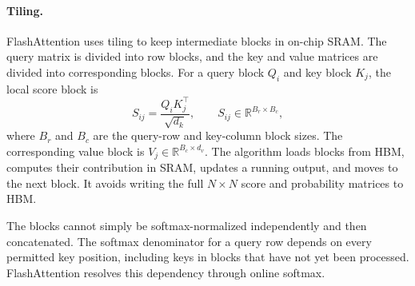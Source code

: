 \paragraph{Tiling.}
FlashAttention uses tiling to keep intermediate blocks in on-chip SRAM.
The query matrix is divided into row blocks, and the key and value
matrices are divided into corresponding blocks. For a query block
\(Q_i\) and key block \(K_j\), the local score block is
\begin{equation}
    S_{ij}
    =
    \frac{Q_iK_j^\top}{\sqrt{d_k}},
    \qquad
    S_{ij}\in\mathbb{R}^{B_r\times B_c},
    \label{eq:attn-flash-score-tile}
\end{equation}
where \(B_r\) and \(B_c\) are the query-row and key-column block sizes.
The corresponding value block is
\(V_j\in\mathbb{R}^{B_c\times d_v}\). The algorithm loads blocks from
HBM, computes their contribution in SRAM, updates a running output, and
moves to the next block. It avoids writing the full \(N\times N\) score
and probability matrices to HBM.

The blocks cannot simply be softmax-normalized independently and then
concatenated. The softmax denominator for a query row depends on every
permitted key position, including keys in blocks that have not yet been
processed. FlashAttention resolves this dependency through online
softmax.

